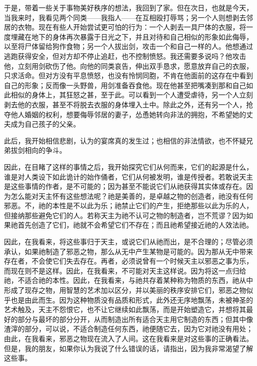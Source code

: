 于是，带着一些关于事物美好秩序的想法，我回到了家。但在次日，也就是今天，当我来时，我看见两个同类——我指人——在互相殴打辱骂；另一个人则想剥去邻居的衣物。现在有些人开始尝试更可怕的行为：一个人剥去一具尸体的衣服，将一度埋藏在地下的身体再次暴露于日光之下，并且对待和自己相似的形象如此侮辱，以至将尸体留给狗作食物；另一个人拔出剑，攻击一个和自己一样的人。他想通过逃跑获得安全，但对方却不停止追赶，也不控制愤怒。我还需要多说吗？他攻击他，立刻用剑砍伤了他。向他的同类哀告，伸出双手恳求，愿意放弃自己的衣服，只求活命。但对方没有平息愤怒，也没有怜悯同胞，不肯在他面前的这存在中看到自己的形象；反而像一头野兽，用剑准备吞食他。现在他甚至把嘴凑到那和自己如此相似的身体上，其狂怒之甚，至于此。可以看到一个人遭受虐待，另一个人立刻剥去他的衣服，甚至不将脱去衣服的身体埋入土中。除此之外，还有另一个人，抢夺他人婚姻的权利，想要侮辱邻居的妻子，怂恿她转向非法的拥抱，不希望她的丈夫成为自己孩子的父亲。\par

此后，我开始相信悲剧，认为的宴席真的发生过；也相信的非法情欲，也不怀疑兄弟拔剑相向的争斗。\par

因此，在目睹了这样的事情之后，我开始探究它们从何而来，它们的起源是什么，谁是对人类设下如此诡计的始作俑者，它们从何被发明，谁是传授者。若敢说天主是这些事情的作者，是不可能的；因为甚至不能说它们从祂获得其实体或存在。因为怎么能对天主怀有这些想法呢？祂是美善的，是卓越之物的创造者，祂没有任何邪恶。不，祂的本性是不以此为乐；祂禁止它们的产生，拒绝那些以此为乐的人，但接纳那些避免它们的人。若称天主为祂不认可之物的制造者，岂不荒谬？因为如果祂首先创造了它们，祂就不会希望它们不存在；而且祂希望接近祂的人效法祂。\par

因此，在我看来，将这些事归于天主，或说它们从祂而出，是不合理的；尽管必须承认，如果祂制造了邪恶之物，那么从无中产生某物是可能的。因为那从无中带来存在者，不会使它们失去存在。再者，必须说曾有一个时候天主以邪恶之事为乐，而现在则不是这样。因此，在我看来，不可能对天主这样说。因为将这一点归给祂，不适合祂的本性。因此，在我看来，与祂共存着某种称为物质的东西，祂从中形成了现存之物，用智慧的艺术加以区分，并以美丽的秩序安排它们，邪恶之物似乎也是由此而生。因为这种物质没有品质和形式，此外还无序地飘荡，未被神圣的艺术触及，天主不怨恨它，也不让它继续如此飘荡，而是开始塑造它，并想将其最好的部分与最坏的部分分开，从而制造出所有适合天主用它制造的东西；但其中像渣滓的部分，可以说，不适合制造任何东西，祂便随它去，因为它对祂没有用处；由此，在我看来，邪恶之物现在流入了人间。这在我看来是对这些事的正确看法。但是，我的朋友，如果你认为我说了什么错误的话，请指出，因为我非常渴望了解这些事。\par

